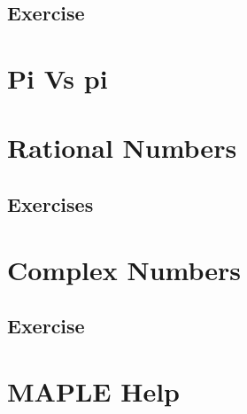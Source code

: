 \documentclass[
]{book}
\theoremstyle{definition}
\theoremstyle{definition}
\theoremstyle{definition}
\theoremstyle{definition}
\theoremstyle{remark}
\begin{document}
\subsection{Exercise}\label{exercise-12}

\section{Pi Vs pi}\label{pi-vs-pi-1}

\section{Rational Numbers}\label{rational-numbers-1}

\subsection{Exercises}\label{exercises-3}

\section{Complex Numbers}\label{complex-numbers-1}

\subsection{Exercise}\label{exercise-13}

\section{MAPLE Help}\label{maple-help-1}

  
\end{document}
